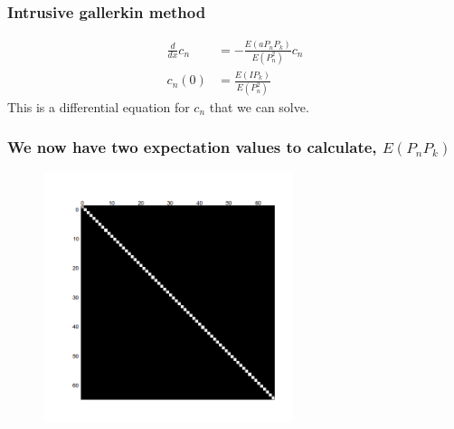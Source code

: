 \documentclass{beamer}
\begin{document}
\begin{frame}
 \frametitle{Intrusive gallerkin method}
 \begin{align*}
 \frac{d}{dx}c_n &= -\frac{E(aP_nP_k)}{E(P_n^2)}c_n\\
 c_n(0) &= \frac{E(IP_k)}{E(P_n^2)}
 \end{align*}
 This is a differential equation for $c_n$ that we can solve.

 \end{frame}

 
\begin{frame}
 \frametitle{We now have two expectation values to calculate, $E(P_nP_k)$}
   \begin{figure}
  \includegraphics[width=0.65\textwidth]{binary_matrix1.png}
 \end{figure}
 \end{frame}
\end{document}
